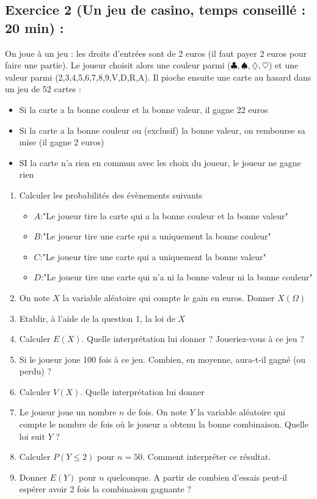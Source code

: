 \subsection*{Exercice 2 (Un jeu de casino, temps conseillé : 20 min) : }
On joue à un jeu : les droits d'entrées sont de 2 euros (il faut payer 2 euros pour faire une partie). Le joueur choisit alors une couleur parmi ($\clubsuit, \spadesuit, \diamondsuit, \heartsuit$) et une valeur parmi (2,3,4,5,6,7,8,9,V,D,R,A). Il pioche ensuite une carte au hasard dans un jeu de 52 cartes :
\begin{itemize}
\item Si la carte a la bonne couleur et la bonne valeur, il gagne 22 euros
\item Si la carte a la bonne couleur ou (exclusif) la bonne valeur, on rembourse sa mise (il gagne 2 euros)
\item SI la carte n'a rien en commun avec les choix du joueur, le joueur ne gagne rien
\end{itemize}
\begin{enumerate}
\item Calculer les probabilités des évènements suivants \begin{itemize}
\item $A$:"Le joueur tire la carte qui a la bonne couleur et la bonne valeur"
\item $B$:"Le joueur tire une carte qui a uniquement la bonne couleur"
\item $C$:"Le joueur tire une carte qui a uniquement la bonne valeur"
\item $D$:"Le joueur tire une carte qui n'a ni la bonne valeur ni la bonne couleur"
\end{itemize}
\item On note $X$ la variable aléatoire qui compte le gain en euros. Donner $X(\Omega)$
\item Etablir, à l'aide de la question 1, la loi de $X$
\item Calculer $E(X)$. Quelle interprétation lui donner ? Joueriez-vous à ce jeu ?
\item Si le joueur joue 100 fois à ce jeu. Combien, en moyenne, aura-t-il gagné (ou perdu) ?
\item Calculer $V(X)$. Quelle interprétation lui donner
\item Le joueur joue un nombre $n$ de fois. On note $Y$ la variable aléatoire qui compte le nombre de fois où le joueur a obtenu la bonne combinaison. Quelle loi suit $Y$ ?
\item Calculer $P(Y \leq 2)$ pour $n= 50$. Comment interpréter ce résultat.
\item Donner $E(Y)$ pour $n$ quelconque. A partir de combien d'essais peut-il espérer avoir 2 fois la combinaison gagnante ?
\end{enumerate}
